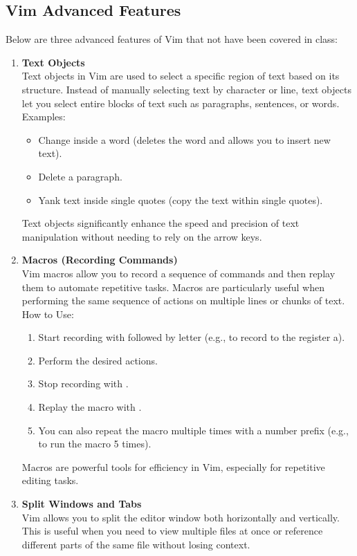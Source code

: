 \documentclass[titlepage]{article}
\begin{document}
\subsection{Vim Advanced Features}
Below are three advanced features of Vim that not have been covered in class:
\begin{enumerate}
\item \textbf{Text Objects}
\\Text objects in Vim are used to select a specific region of text based on its structure. Instead of manually selecting text by character or line, text objects let you select entire blocks of text such as paragraphs, sentences, or words.
Examples:
\begin{itemize}
  \item {} Change inside a word (deletes the word and allows you to insert new text).
  \item {} Delete a paragraph.
  \item {} Yank text inside single quotes (copy the text within single quotes).
\end{itemize}
Text objects significantly enhance the speed and precision of text manipulation without needing to rely on the arrow keys.
\item \textbf{Macros (Recording Commands)}
\\Vim macros allow you to record a sequence of commands and then replay them to automate repetitive tasks. Macros are particularly useful when performing the same sequence of actions on multiple lines or chunks of text.
How to Use:
\begin{enumerate}
  \item Start recording with  followed by  letter (e.g.,  to record to the register a).
  \item Perform the desired actions.
  \item Stop recording with .
  \item Replay the macro with .
  \item You can also repeat the macro multiple times with a number prefix (e.g.,  to run the macro 5 times).
\end{enumerate}
Macros are powerful tools for efficiency in Vim, especially for repetitive editing tasks.
\item \textbf{Split Windows and Tabs}
\\Vim allows you to split the editor window both horizontally and vertically. This is useful when you need to view multiple files at once or reference different parts of the same file without losing context.

\end{enumerate}
\end{document}
